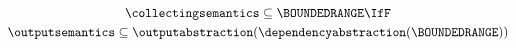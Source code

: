 \begin{gather*}
  \collectingsemantics \subseteq \BOUNDEDRANGE
  \IfF \\
  \outputsemantics \subseteq \outputabstraction(\dependencyabstraction(\BOUNDEDRANGE))
\end{gather*}
